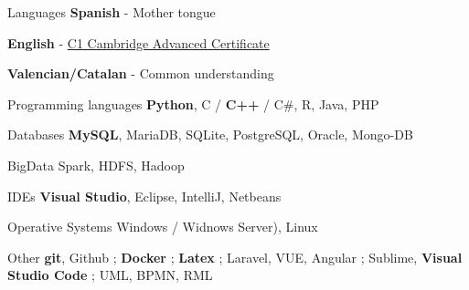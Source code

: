 

\begin{cvskills}
  \cvskill
    {Languages} %
    {\textbf{Spanish} - Mother tongue} %
    
  \cvskill
	{} %
	{\textbf{English} - \href{https://bit.ly/48MClKA}{C1 Cambridge Advanced Certificate}} %
	
  \cvskill
	{} %
	{\textbf{Valencian/Catalan} - Common understanding} %
	
  \cvskill
	{Programming languages} %
	{\textbf{Python},  C / \textbf{C++} / C\#,  R,  Java,  PHP} %
	
  \cvskill
	{Databases} %
	{\textbf{MySQL},  MariaDB,  SQLite,  PostgreSQL,  Oracle,  Mongo-DB} %
	
  \cvskill
	{BigData} %
	{Spark, HDFS, Hadoop} %
	
  \cvskill
	{IDEs} %
	{\textbf{Visual Studio},  Eclipse,  IntelliJ,  Netbeans} %
 
  \cvskill
	{Operative Systems} %
	{Windows / Widnows Server),  Linux} %
 
  \cvskill
	{Other} %
	{\textbf{git}, Github ; \textbf{Docker} ; \textbf{Latex} ;  Laravel, VUE, Angular ; Sublime, \textbf{Visual Studio Code} ; UML,  BPMN,  RML} %
\end{cvskills}
